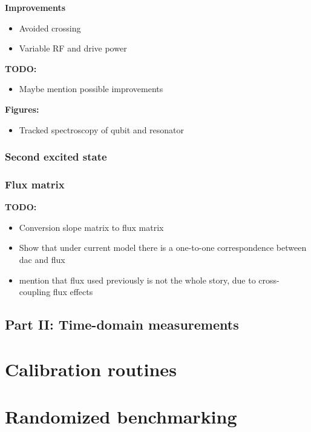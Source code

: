 \documentclass[12pt]{report}
\begin{document}
        \textbf{Improvements}
        \begin{itemize}
          \item Avoided crossing
          \item Variable RF and drive power
        \end{itemize}
        \textbf{TODO:}
        \begin{itemize}
          \item Maybe mention possible improvements
        \end{itemize}
        \textbf{Figures:}
        \begin{itemize}
          \item Tracked spectroscopy of qubit and resonator
        \end{itemize}



      \subsection{Second excited state}





      \subsection{Flux matrix}
      \textbf{TODO:}
      \begin{itemize}
        \item Conversion slope matrix to flux matrix
        \item Show that under current model there is a one-to-one correspondence between dac and flux
        \item mention that flux used previously is not the whole story, due to cross-coupling flux effects
      \end{itemize}

    \section{Part II: Time-domain measurements}








  \chapter{Calibration routines}


  \chapter{Randomized benchmarking}
\end{document}
